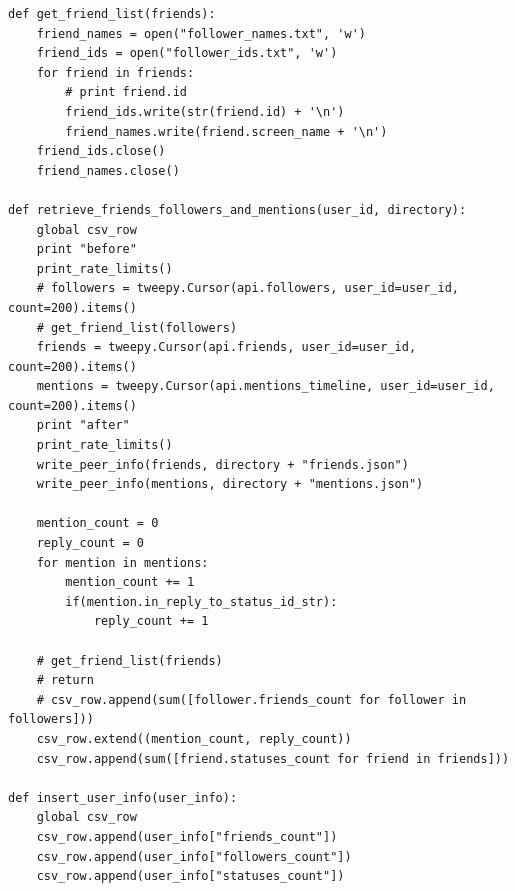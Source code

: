 \documentclass[11pt]{article}
\begin{document}
\begin{lstlisting}
def get_friend_list(friends):
    friend_names = open("follower_names.txt", 'w')
    friend_ids = open("follower_ids.txt", 'w')
    for friend in friends:
        # print friend.id
        friend_ids.write(str(friend.id) + '\n')
        friend_names.write(friend.screen_name + '\n')
    friend_ids.close()
    friend_names.close()

def retrieve_friends_followers_and_mentions(user_id, directory):
    global csv_row
    print "before"
    print_rate_limits()
    # followers = tweepy.Cursor(api.followers, user_id=user_id, count=200).items()
    # get_friend_list(followers)
    friends = tweepy.Cursor(api.friends, user_id=user_id, count=200).items()
    mentions = tweepy.Cursor(api.mentions_timeline, user_id=user_id, count=200).items()
    print "after"
    print_rate_limits()
    write_peer_info(friends, directory + "friends.json")
    write_peer_info(mentions, directory + "mentions.json")

    mention_count = 0 
    reply_count = 0 
    for mention in mentions:
        mention_count += 1
        if(mention.in_reply_to_status_id_str):
            reply_count += 1

    # get_friend_list(friends)
    # return
    # csv_row.append(sum([follower.friends_count for follower in followers]))
    csv_row.extend((mention_count, reply_count))
    csv_row.append(sum([friend.statuses_count for friend in friends]))

def insert_user_info(user_info):
    global csv_row
    csv_row.append(user_info["friends_count"])
    csv_row.append(user_info["followers_count"])
    csv_row.append(user_info["statuses_count"])


\end{lstlisting}
\end{document}
